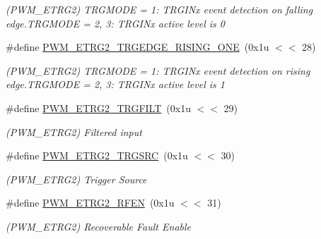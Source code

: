 \begin{DoxyCompactItemize}
\begin{DoxyCompactList}\small\item\em (P\+W\+M\+\_\+\+E\+T\+R\+G2) T\+R\+G\+M\+O\+DE = 1\+: T\+R\+G\+I\+Nx event detection on falling edge.\+T\+R\+G\+M\+O\+DE = 2, 3\+: T\+R\+G\+I\+Nx active level is 0 \end{DoxyCompactList}\item 
\mbox{\label{group__SAMS70__PWM_ga60b0ef66c25c92f2cb53dc982aa679c9}} 
\#define \mbox{\hyperlink{group__SAMS70__PWM_ga60b0ef66c25c92f2cb53dc982aa679c9}{P\+W\+M\+\_\+\+E\+T\+R\+G2\+\_\+\+T\+R\+G\+E\+D\+G\+E\+\_\+\+R\+I\+S\+I\+N\+G\+\_\+\+O\+NE}}~(0x1u $<$$<$ 28)
\begin{DoxyCompactList}\small\item\em (P\+W\+M\+\_\+\+E\+T\+R\+G2) T\+R\+G\+M\+O\+DE = 1\+: T\+R\+G\+I\+Nx event detection on rising edge.\+T\+R\+G\+M\+O\+DE = 2, 3\+: T\+R\+G\+I\+Nx active level is 1 \end{DoxyCompactList}\item 
\mbox{\label{group__SAMS70__PWM_ga7abd54fd12e1034101295c7f1517ad99}} 
\#define \mbox{\hyperlink{group__SAMS70__PWM_ga7abd54fd12e1034101295c7f1517ad99}{P\+W\+M\+\_\+\+E\+T\+R\+G2\+\_\+\+T\+R\+G\+F\+I\+LT}}~(0x1u $<$$<$ 29)
\begin{DoxyCompactList}\small\item\em (P\+W\+M\+\_\+\+E\+T\+R\+G2) Filtered input \end{DoxyCompactList}\item 
\mbox{\label{group__SAMS70__PWM_ga4f0be694bd13e2e7e8638e7f3b96b631}} 
\#define \mbox{\hyperlink{group__SAMS70__PWM_ga4f0be694bd13e2e7e8638e7f3b96b631}{P\+W\+M\+\_\+\+E\+T\+R\+G2\+\_\+\+T\+R\+G\+S\+RC}}~(0x1u $<$$<$ 30)
\begin{DoxyCompactList}\small\item\em (P\+W\+M\+\_\+\+E\+T\+R\+G2) Trigger Source \end{DoxyCompactList}\item 
\mbox{\label{group__SAMS70__PWM_gac1578b27277cba0582ea65c620ea5005}} 
\#define \mbox{\hyperlink{group__SAMS70__PWM_gac1578b27277cba0582ea65c620ea5005}{P\+W\+M\+\_\+\+E\+T\+R\+G2\+\_\+\+R\+F\+EN}}~(0x1u $<$$<$ 31)
\begin{DoxyCompactList}\small\item\em (P\+W\+M\+\_\+\+E\+T\+R\+G2) Recoverable Fault Enable \end{DoxyCompactList}\item 

\end{DoxyCompactItemize}
